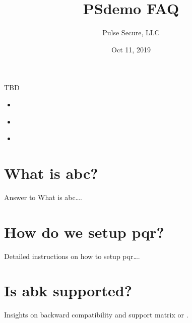 \documentclass[letterpaper,10pt,english]{sphinxmanual}
\title{PSdemo FAQ}
\date{Oct 11, 2019}
\author{Pulse Secure, LLC}
\begin{document}
\pagestyle{empty}
\sphinxmaketitle
\pagestyle{plain}
\sphinxtableofcontents
\pagestyle{normal}
\label{\detokenize{faq::doc}}


TBD

\begin{sphinxShadowBox}
\begin{itemize}
\item {} 
\label{\detokenize{faq:id1}}{\hyperref[\detokenize{faq:what-is-abc}]{}}

\item {} 
\label{\detokenize{faq:id2}}{\hyperref[\detokenize{faq:how-do-we-setup-pqr}]{}}

\item {} 
\label{\detokenize{faq:id3}}{\hyperref[\detokenize{faq:is-abk-supported}]{}}

\end{itemize}
\end{sphinxShadowBox}


\chapter{What is abc?}
\label{\detokenize{faq:what-is-abc}}
Answer to What is abc….


\chapter{How do we setup pqr?}
\label{\detokenize{faq:how-do-we-setup-pqr}}
Detailed instructions on how to setup pqr….


\chapter{Is abk supported?}
\label{\detokenize{faq:is-abk-supported}}
Insights on backward compatibility and support matrix or .



\renewcommand{\indexname}{Index}
\printindex
\end{document}
